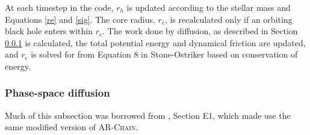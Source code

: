 \documentclass[fleqn,usenatbib,useAMS]{mnras}
\begin{document}
At each timestep in the code, $r_h$ is updated according to the stellar mass and Equations \ref{re} and \ref{sig}.  The core radius, $r_c$, is recalculated only if an orbiting black hole enters within $r_c$.  The work done by diffusion, as described in Section \ref{psd} is calculated, the total potential energy and dynamical friction are updated, and $r_c$ is solved for from Equation 8 in Stone-Ostriker based on conservation of energy.

\subsubsection{Phase-space diffusion} \label{psd}
Much of this subsection was borrowed from \citet{2017MNRAS.467.4180S}, Section E1, which made use the same modified version of \textsc{AR-Chain}.
\end{document}
